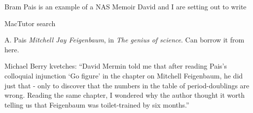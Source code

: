 {Bram Pais} is an example of a NAS Memoir David and I are setting out to
write

{MacTutor} search


A. Pais
{\em Mitchell Jay Feigenbaum}, in {\em The genius of science}.
Can borrow it from
 {here}.

Michael Berry
{kvetches}: ``David Mermin told me that after reading Pais's colloquial
injunction `Go figure' in the chapter on Mitchell Feigenbaum, he did just
that - only to discover that the numbers in the table of period-doublings
are wrong. Reading the same chapter, I wondered why the author thought it
worth telling us that Feigenbaum was toilet-trained by six months.''

\printbibliography[heading=subbibintoc,title={References}]
